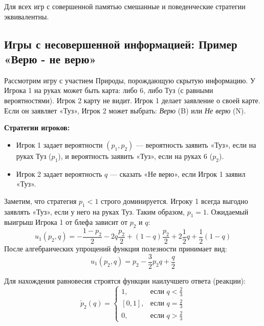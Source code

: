 \begin{theorem}[Кун, 1953]\label{thm:kuhn_behavioral}
Для всех игр с совершенной памятью смешанные и поведенческие стратегии эквивалентны.
\end{theorem}

\subsection{Игры с несовершенной информацией: Пример «Верю - не верю»}

Рассмотрим игру с участием Природы, порождающую скрытую информацию. 
У Игрока 1 на руках может быть карта: либо $6$, либо Туз (с равными вероятностями). Игрок 2 карту не видит. 
Игрок 1 делает заявление о своей карте. Если он заявляет «Туз», Игрок 2 может выбрать: \textit{Верю} (B) или \textit{Не верю} (N).

\textbf{Стратегии игроков:}
\begin{itemize}
    \item Игрок 1 задает вероятности $(p_1, p_2)$ — вероятность заявить «Туз», если на руках Туз ($p_1$), и вероятность заявить «Туз», если на руках $6$ ($p_2$).
    \item Игрок 2 задает вероятность $q$ — сказать «Не верю», если Игрок 1 заявил «Туз».
\end{itemize}

Заметим, что стратегия $p_1 < 1$ строго доминируется. Игроку 1 всегда выгодно заявлять «Туз», если у него на руках Туз. Таким образом, $p_1 = 1$. Ожидаемый выигрыш Игрока 1 от блефа зависит от $p_2$ и $q$:
\begin{equation}
    u_1(p_2, q) = -\frac{1-p_2}{2} - 2q \frac{p_2}{2} + (1-q)\frac{p_2}{2} + 2\frac{1}{2}q + \frac{1}{2}(1-q)
\end{equation}
После алгебраических упрощений функция полезности принимает вид:
\begin{equation}
    u_1(p_2, q) = p_2 - \frac{3}{2}p_2 q + \frac{q}{2}
\end{equation}

Для нахождения равновесия строятся функции наилучшего ответа (реакции):
\begin{equation}
    \check{p}_2(q) = 
    \begin{cases} 
    1, & \text{если } q < \frac{2}{3} \\ 
    [0, 1], & \text{если } q = \frac{2}{3} \\ 
    0, & \text{если } q > \frac{2}{3} 
    \end{cases}
\end{equation}

